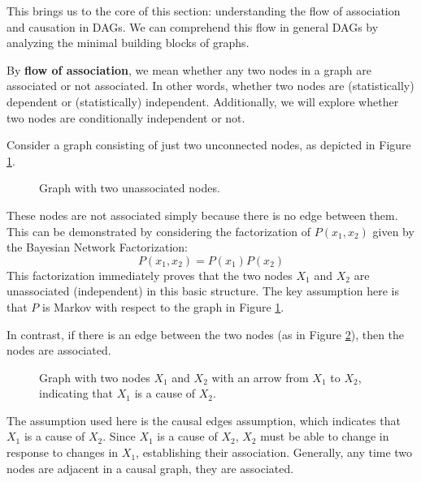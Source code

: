 This brings us to the core of this section: understanding the flow
of association and causation in DAGs. We can comprehend this flow
in general DAGs by analyzing the minimal building blocks of graphs.

By \textbf{flow of association}, we mean whether any two nodes in
a graph are associated or not associated. In other words, whether two nodes are
(statistically) dependent or (statistically) independent.
Additionally, we will explore whether two nodes are conditionally
independent or not.

Consider a graph consisting of just two unconnected nodes,
as depicted in Figure \ref{fig:unconnected_nodes}.

\begin{figure}[h]
    \centering
    \caption{Graph with two unassociated nodes.}
    \label{fig:unconnected_nodes}
\end{figure}

These nodes are not associated simply because there is no edge between them.
This can be demonstrated by considering the factorization of \( P(x_1, x_2) \)
given by the Bayesian Network Factorization:
\[
P(x_1, x_2) = P(x_1) P(x_2)
\]
This factorization immediately proves that the two nodes
\( X_1 \) and \( X_2 \) are unassociated (independent)
in this basic structure. The key assumption here is that \( P \)
is Markov with respect to the graph in Figure \ref{fig:unconnected_nodes}.

In contrast, if there is an edge between the two nodes
(as in Figure \ref{fig:connected_nodes}),
then the nodes are associated.
\begin{figure}[h]
    \centering
    \caption{Graph with two nodes \(X_1\) and \(X_2\) with an arrow from \(X_1\) to \(X_2\), indicating that \(X_1\) is a cause of \(X_2\).}
    \label{fig:connected_nodes}
\end{figure}
The assumption used
here is the causal edges assumption, which indicates that
\( X_1 \) is a cause of \( X_2 \). Since \( X_1 \) is a
cause of \( X_2 \), \( X_2 \) must be able to change
in response to changes in \( X_1 \), establishing their
association. Generally, any time two nodes are adjacent
in a causal graph, they are associated.

